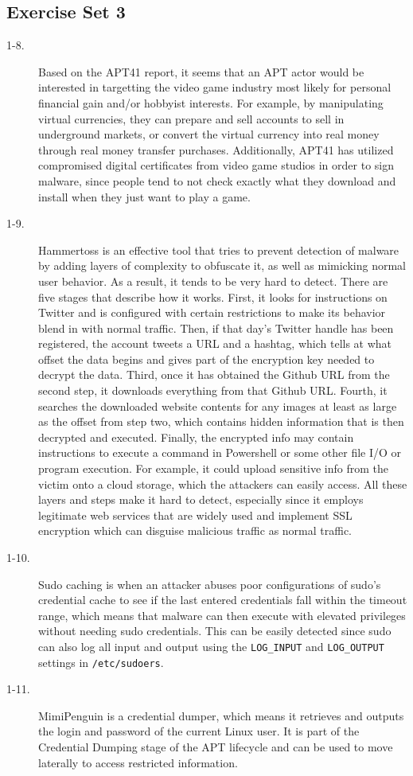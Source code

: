 \documentclass[11pt]{article}
\begin{document}
\subsection*{Exercise Set 3}
\begin{description}
  \item[1-8.] Based on the APT41 report, it seems that an APT actor would be interested in targetting the video game industry
    most likely for personal financial gain and/or hobbyist interests. For example, by manipulating virtual currencies, they
    can prepare and sell accounts to sell in underground markets, or convert the virtual currency into real money through real
    money transfer purchases. Additionally, APT41 has utilized compromised digital certificates from video game studios in order
    to sign malware, since people tend to not check exactly what they download and install when they just want to play a game.
  \item[1-9.] Hammertoss is an effective tool that tries to prevent detection of malware by adding layers of complexity to
    obfuscate it, as well as mimicking normal user behavior. As a result, it tends to be very hard to detect. There are five
    stages that describe how it works. First, it looks for instructions on Twitter and is configured with certain restrictions
    to make its behavior blend in with normal traffic. Then, if that day's Twitter handle has been registered, the account
    tweets a URL and a hashtag, which tells at what offset the data begins and gives part of the encryption key needed to
    decrypt the data. Third, once it has obtained the Github URL from the second step, it downloads everything from that Github
    URL. Fourth, it searches the downloaded website contents for any images at least as large as the offset from step two, which
    contains hidden information that is then decrypted and executed. Finally, the encrypted info may contain instructions to
    execute a command in Powershell or some other file I/O or program execution. For example, it could upload sensitive info
    from the victim onto a cloud storage, which the attackers can easily access. All these layers and steps make it hard to 
    detect, especially since it employs legitimate web services that are widely used and implement SSL encryption which can
    disguise malicious traffic as normal traffic.
  \item[1-10.] Sudo caching is when an attacker abuses poor configurations of sudo's credential cache to see if the last entered
    credentials fall within the timeout range, which means that malware can then execute with elevated privileges without
    needing sudo credentials. This can be easily detected since sudo can also log all input and output using the \verb|LOG_INPUT| and
    \verb|LOG_OUTPUT| settings in \verb|/etc/sudoers|.
  \item[1-11.] MimiPenguin is a credential dumper, which means it retrieves and outputs the login and password of the current
    Linux user. It is part of the Credential Dumping stage of the APT lifecycle and can be used to move laterally to access
    restricted information.~\cite{cred_dump}
\end{description}
\end{document}
